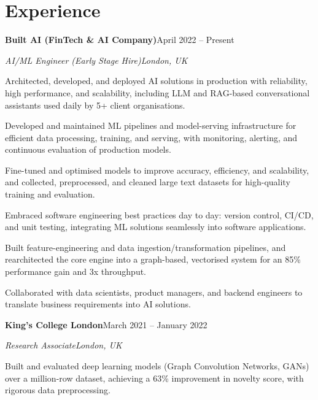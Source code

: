 \documentclass[10pt,a4paper]{article}
\newcommand{\entry}[4]{%
  {\color{company}\bfseries #1}\hfill {\color{muted}#2}\par
  \vspace{1pt}
  {\itshape #3}\hfill {\color{muted}\itshape #4}\par
  \vspace{3pt}%
}
\begin{document}
\section{Experience}
\entry{Built AI (FinTech \& AI Company)}{April 2022 -- Present}{AI/ML Engineer (Early Stage Hire)}{London, UK}
\begin{tight}
  \item Architected, developed, and deployed AI solutions in production with reliability, high performance, and scalability, including LLM and RAG-based conversational assistants used daily by 5+ client organisations.
  \item Developed and maintained ML pipelines and model-serving infrastructure for efficient data processing, training, and serving, with monitoring, alerting, and continuous evaluation of production models.
  \item Fine-tuned and optimised models to improve accuracy, efficiency, and scalability, and collected, preprocessed, and cleaned large text datasets for high-quality training and evaluation.
  \item Embraced software engineering best practices day to day: version control, CI/CD, and unit testing, integrating ML solutions seamlessly into software applications.
  \item Built feature-engineering and data ingestion/transformation pipelines, and rearchitected the core engine into a graph-based, vectorised system for an 85\% performance gain and 3x throughput.
  \item Collaborated with data scientists, product managers, and backend engineers to translate business requirements into AI solutions.
\end{tight}

\entry{King's College London}{March 2021 -- January 2022}{Research Associate}{London, UK}
\begin{tight}
  \item Built and evaluated deep learning models (Graph Convolution Networks, GANs) over a million-row dataset, achieving a 63\% improvement in novelty score, with rigorous data preprocessing.
\end{tight}

\end{document}
